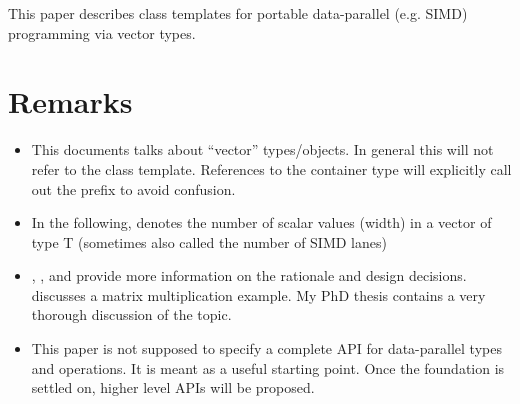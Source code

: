 \newcommand\disallowUserSpecialization[1]{The behavior of a program that adds specializations for \code{#1} is undefined.}

\newcommand\targetArch{target architecture\xspace}
\newcommand\targetArchs{target architectures\xspace}
\newcommand\currentTarget{currently targeted system\xspace}

\newcommand\specialsfinae{shall not participate in overload resolution\xspace}

\newcommand\realArithmeticType{vectorizable type\xspace}

\usepackage{pifont}

\newcommand\foralli[1][]{for all \code i $\in$ \code{[0, #1size())}\xspace}
\newcommand\forallmaskedi[2][]{%
  for all \code i
  $\in \{j \in \mathbb{N}_0 | j < \code{#1size()} ⋀ \code{#2[}j\code{]}\}$%
  \xspace%
}
\newcommand\chck{\item[\color{black}\ensuremath{\checkmark}]}
\newcommand\todo{\item[\color{black}\ding{46}] \color{gray}}
\newcommand\itemheader[1]{\item[] \hfill \textcolor{gray}{\textsc{#1}}}


\begin{wgTitlepage}
  This paper describes class templates for portable data-parallel (e.g. SIMD) programming via vector types.
\end{wgTitlepage}

\pagestyle{scrheadings}
\addtocounter{section}{-1}
\section{Remarks}
\begin{itemize}
  \item This documents talks about “vector” types/objects.
    In general this will not refer to the \std{} class template.
    References to the container type will explicitly call out the  prefix to avoid confusion.
  \item In the following,  denotes the number of scalar values (width) in a vector of type \type T (sometimes also called the number of SIMD lanes)
  \item \parencite{N4184}, \parencite{N4185}, and \parencite{N4395} provide more information on the rationale and design decisions.
    \parencite{N4454} discusses a matrix multiplication example.
    My PhD thesis \parencite{Kretz2015} contains a very thorough discussion of the topic.
  \item This paper is not supposed to specify a complete API for data-parallel types and operations.
    It is meant as a useful starting point.
    Once the foundation is settled on, higher level APIs will be proposed.
\end{itemize}

